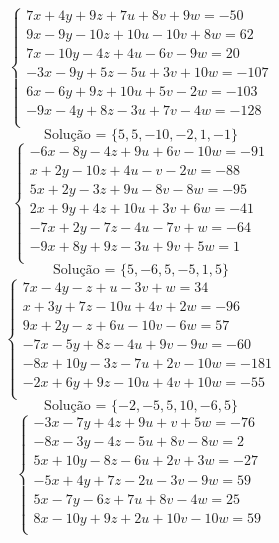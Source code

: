 \documentclass[12pt,oneside,a4paper]{article}
\begin{document}
\vspace{\baselineskip}
\begin{equation*}
\begin{cases}
7x+4y+9z+7u+8v+9w=-50 \\
9x-9y-10z+10u-10v+8w=62 \\
7x-10y-4z+4u-6v-9w=20 \\
-3x-9y+5z-5u+3v+10w=-107 \\
6x-6y+9z+10u+5v-2w=-103 \\
-9x-4y+8z-3u+7v-4w=-128 \\
\end{cases}
\end{equation*}
\begin{equation*}
\text{Solução = }\{5,5,-10,-2,1,-1\}
\end{equation*}
\vspace{\baselineskip}
\begin{equation*}
\begin{cases}
-6x-8y-4z+9u+6v-10w=-91 \\
x+2y-10z+4u-v-2w=-88 \\
5x+2y-3z+9u-8v-8w=-95 \\
2x+9y+4z+10u+3v+6w=-41 \\
-7x+2y-7z-4u-7v+w=-64 \\
-9x+8y+9z-3u+9v+5w=1 \\
\end{cases}
\end{equation*}
\begin{equation*}
\text{Solução = }\{5,-6,5,-5,1,5\}
\end{equation*}
\vspace{\baselineskip}
\begin{equation*}
\begin{cases}
7x-4y-z+u-3v+w=34 \\
x+3y+7z-10u+4v+2w=-96 \\
9x+2y-z+6u-10v-6w=57 \\
-7x-5y+8z-4u+9v-9w=-60 \\
-8x+10y-3z-7u+2v-10w=-181 \\
-2x+6y+9z-10u+4v+10w=-55 \\
\end{cases}
\end{equation*}
\begin{equation*}
\text{Solução = }\{-2,-5,5,10,-6,5\}
\end{equation*}
\vspace{\baselineskip}
\begin{equation*}
\begin{cases}
-3x-7y+4z+9u+v+5w=-76 \\
-8x-3y-4z-5u+8v-8w=2 \\
5x+10y-8z-6u+2v+3w=-27 \\
-5x+4y+7z-2u-3v-9w=59 \\
5x-7y-6z+7u+8v-4w=25 \\
8x-10y+9z+2u+10v-10w=59 \\
\end{cases}
\end{equation*}
\end{document}
